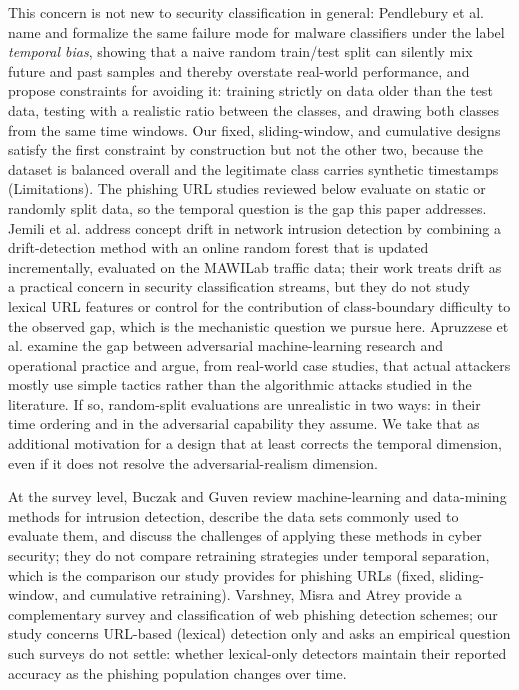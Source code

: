 \documentclass[10pt, a4paper, oneside]{article}
\begin{document}
This concern is not new to security classification in general: Pendlebury et al. \cite{pendlebury2019tesseract} name and formalize the same failure mode for malware classifiers under the label \emph{temporal bias}, showing that a naive random train/test split can silently mix future and past samples and thereby overstate real-world performance, and propose constraints for avoiding it: training strictly on data older than the test data, testing with a realistic ratio between the classes, and drawing both classes from the same time windows. Our fixed, sliding-window, and cumulative designs satisfy the first constraint by construction but not the other two, because the dataset is balanced overall and the legitimate class carries synthetic timestamps (Limitations). The phishing URL studies reviewed below evaluate on static or randomly split data, so the temporal question is the gap this paper addresses. Jemili et al. \cite{jemili2024ids} address concept drift in network intrusion detection by combining a drift-detection method with an online random forest that is updated incrementally, evaluated on the MAWILab traffic data; their work treats drift as a practical concern in security classification streams, but they do not study lexical URL features or control for the contribution of class-boundary difficulty to the observed gap, which is the mechanistic question we pursue here. Apruzzese et al. \cite{apruzzese2023real} examine the gap between adversarial machine-learning research and operational practice and argue, from real-world case studies, that actual attackers mostly use simple tactics rather than the algorithmic attacks studied in the literature. If so, random-split evaluations are unrealistic in two ways: in their time ordering and in the adversarial capability they assume. We take that as additional motivation for a design that at least corrects the temporal dimension, even if it does not resolve the adversarial-realism dimension.

At the survey level, Buczak and Guven \cite{buczak2016survey} review machine-learning and data-mining methods for intrusion detection, describe the data sets commonly used to evaluate them, and discuss the challenges of applying these methods in cyber security; they do not compare retraining strategies under temporal separation, which is the comparison our study provides for phishing URLs (fixed, sliding-window, and cumulative retraining). Varshney, Misra and Atrey \cite{varshney2016phishing} provide a complementary survey and classification of web phishing detection schemes; our study concerns URL-based (lexical) detection only and asks an empirical question such surveys do not settle: whether lexical-only detectors maintain their reported accuracy as the phishing population changes over time.
\end{document}

